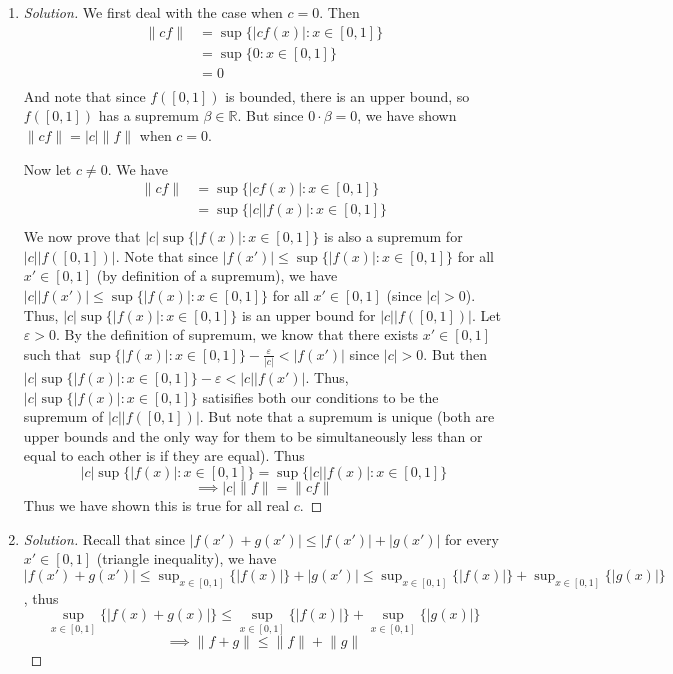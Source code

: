 \documentclass{article}
\newcommand{\R}{{\mathbb R}}
\newcommand{\ep}{{\varepsilon}}
\begin{document}
\begin{enumerate}
	\item \begin{proof}[Solution]\let\qed\relax
		We first deal with the case when $c = 0$.
		Then
		\begin{align*}
			\lVert cf \rVert
			&= \sup\{|cf(x)| \colon x \in [0,1]\}\\
			&= \sup\{0 \colon x \in [0,1]\}\\
			&= 0\\
		\end{align*}
		And note that since $f([0,1])$ is bounded,
		there is an upper bound, so $f([0,1])$ has a supremum $\beta \in \R$.
		But since $0\cdot \beta = 0$,
		we have shown $\lVert cf \rVert = |c|\lVert f\rVert$ when $c=0$.

		Now let $c \neq 0$.
		We have
		\begin{align*}
			\lVert cf \rVert
			&= \sup\{|cf(x)| \colon x \in [0,1]\}\\
			&= \sup\{|c||f(x)| \colon x \in [0,1]\}\\
		\end{align*}
		We now prove that $|c|\sup\{|f(x)| \colon x \in [0,1]\}$
		is also a supremum for $|c||f([0,1])|$.
		Note that since $|f(x')| \leq \sup\{|f(x)| \colon x \in [0,1]\}$
		for all $x' \in [0,1]$ (by definition of a supremum),
		we have $|c||f(x')| \leq \sup\{|f(x)| \colon x \in [0,1]\}$
		for all $x' \in [0,1]$ (since $|c| > 0$).
		Thus, $|c|\sup\{|f(x)| \colon x \in [0,1]\}$ is an upper bound for $|c||f([0,1])|$.
		Let $\ep > 0$.
		By the definition of supremum, we know that there exists $x'\in [0,1]$ such that
		$\sup\{|f(x)| \colon x \in [0,1]\} - \frac{\ep}{|c|} < |f(x')|$
		since $|c| > 0$.
		But then $|c|\sup\{|f(x)| \colon x \in [0,1]\} - \ep < |c||f(x')|$.
		Thus, $|c|\sup\{|f(x)| \colon x \in [0,1]\}$
		satisifies both our conditions to be the supremum of $|c||f([0,1])|$.
		But note that a supremum is unique (both are upper bounds and
		the only way for them to be simultaneously less than or equal to each other
		is if they are equal).
		Thus
		\[
			|c|\sup\{|f(x)| \colon x \in [0,1]\} = \sup\{|c||f(x)|\colon x \in [0,1]\}
		\]
		\[
			\implies |c|\lVert f \rVert = \lVert cf\rVert
		\]
		Thus we have shown this is true for all real $c$.
	\end{proof}
	\item \begin{proof}[Solution]\let\qed\relax
		Recall that since $|f(x') + g(x')| \leq |f(x')| + |g(x')|$
		for every $x' \in [0,1]$ (triangle inequality),
		we have $|f(x') + g(x')| \leq \sup_{x\in[0,1]}\{|f(x)|\} + |g(x')|
		\leq \sup_{x\in[0,1]}\{|f(x)|\} + \sup_{x\in[0,1]}\{|g(x)|\}$,
		thus
		\[
			\sup_{x \in [0,1]}\{|f(x) + g(x)|\}
			\leq \sup_{x\in[0,1]}\{|f(x)|\} + \sup_{x\in[0,1]}\{|g(x)|\}
		\]
		\[
			\implies \lVert f + g \rVert \leq \lVert f \rVert + \lVert g \rVert
		\]


\end{proof}
\end{enumerate}
\end{document}
